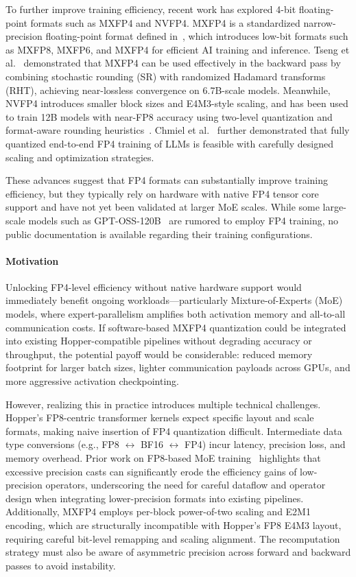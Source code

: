 To further improve training efficiency, recent work has explored 4-bit floating-point formats such as MXFP4 and NVFP4. MXFP4 is a standardized narrow-precision floating-point format defined in~\cite{ocp_mx_specification}, which introduces low-bit formats such as MXFP8, MXFP6, and MXFP4 for efficient AI training and inference. Tseng et al.~\cite{mxfp4training2025} demonstrated that MXFP4 can be used effectively in the backward pass by combining stochastic rounding (SR) with randomized Hadamard transforms (RHT), achieving near-lossless convergence on 6.7B-scale models. Meanwhile, NVFP4 introduces smaller block sizes and E4M3-style scaling, and has been used to train 12B models with near-FP8 accuracy using two-level quantization and format-aware rounding heuristics~\cite{nvfp4training2025}. Chmiel et al.~\cite{chmiel2025fp4wayfullyquantized} further demonstrated that fully quantized end-to-end FP4 training of LLMs is feasible with carefully designed scaling and optimization strategies.

These advances suggest that FP4 formats can substantially improve training efficiency, but they typically rely on hardware with native FP4 tensor core support and have not yet been validated at larger MoE scales. While some large-scale models such as GPT-OSS-120B~\cite{gptoss2025} are rumored to employ FP4 training, no public documentation is available regarding their training configurations.




\paragraph{Motivation}
Unlocking FP4-level efficiency without native hardware support would immediately benefit ongoing workloads—particularly Mixture-of-Experts (MoE) models, where expert-parallelism amplifies both activation memory and all-to-all communication costs. If software-based MXFP4 quantization could be integrated into existing Hopper-compatible pipelines without degrading accuracy or throughput, the potential payoff would be considerable: reduced memory footprint for larger batch sizes, lighter communication payloads across GPUs, and more aggressive activation checkpointing.

However, realizing this in practice introduces multiple technical challenges. Hopper's FP8-centric transformer kernels expect specific layout and scale formats, making naive insertion of FP4 quantization difficult. Intermediate data type conversions (e.g., FP8 $\leftrightarrow$ BF16 $\leftrightarrow$ FP4) incur latency, precision loss, and memory overhead. Prior work on FP8-based MoE training~\cite{fp8flowmoe2025} highlights that excessive precision casts can significantly erode the efficiency gains of low-precision operators, underscoring the need for careful dataflow and operator design when integrating lower-precision formats into existing pipelines. Additionally, MXFP4 employs per-block power-of-two scaling and E2M1 encoding, which are structurally incompatible with Hopper's FP8 E4M3 layout, requiring careful bit-level remapping and scaling alignment. The recomputation strategy must also be aware of asymmetric precision across forward and backward passes to avoid instability.

